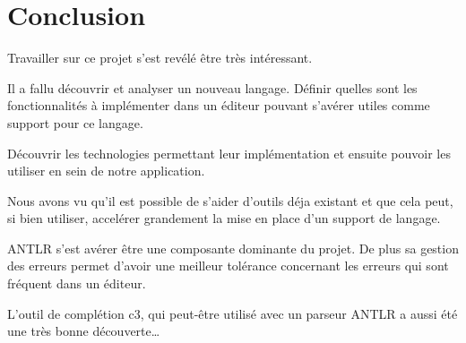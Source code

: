 \documentclass[
    iict, %
    il, %
]{heig-tb}
\begin{document}


\chapter{Conclusion}



Travailler sur ce projet s'est revélé être très intéressant.


Il a fallu découvrir et analyser un nouveau langage.
Définir quelles sont les fonctionnalités à implémenter dans un éditeur pouvant s'avérer utiles comme support pour ce langage.

Découvrir les technologies permettant leur implémentation et ensuite pouvoir les utiliser en sein de notre application. %



Nous avons vu qu'il est possible de s'aider d'outils déja existant et que cela peut, si bien utiliser, accelérer grandement la mise en place d'un support de langage.

ANTLR s'est avérer être une composante dominante du projet. De plus sa gestion des erreurs permet d'avoir une meilleur tolérance concernant les erreurs
qui sont fréquent dans un éditeur.

L'outil de complétion c3, qui peut-être utilisé avec un parseur ANTLR a aussi été une très bonne découverte\dots

\end{document}
